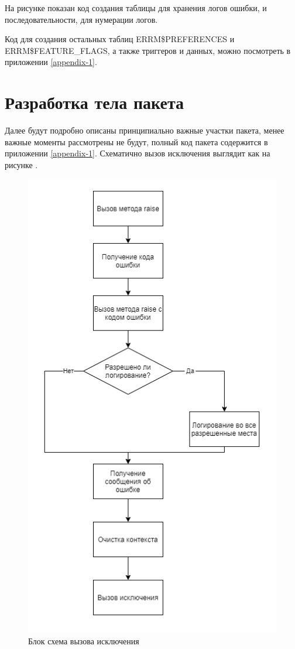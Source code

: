 На рисунке  показан код создания таблицы для хранения логов ошибки, и последовательности, для нумерации логов.

Код для создания остальных таблиц ERRM\$PREFERENCES и ERRM\$FEATURE\_FLAGS, а также триггеров и данных, можно посмотреть в приложении \ref{appendix-1}. 


\section{Разработка тела пакета} \label{ch3:sec7}

Далее будут подробно описаны принципиально важные участки пакета, менее важные моменты рассмотрены не будут, полный код пакета содержится в приложении \ref{appendix-1}.
Схематично вызов исключения выглядит как на рисунке . 

\begin{figure}[ht!] 
	\center
	\includegraphics [scale=1] {my_folder/img/c3_block_schema.png}
	\caption{Блок схема вызова исключения} 
	\label{fig:c3_block_schema}  
\end{figure}
\FloatBarrier

